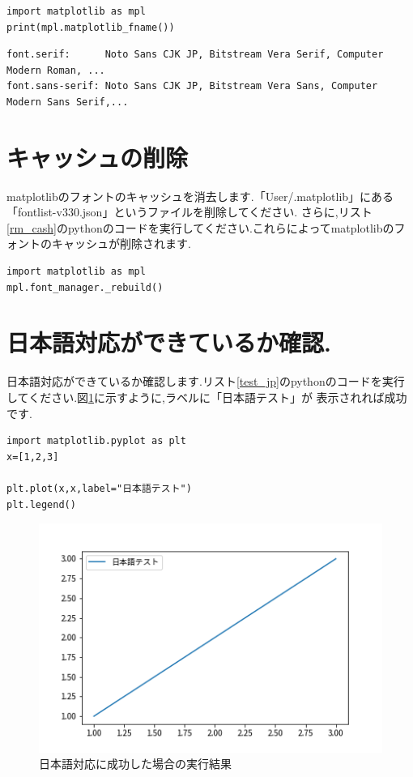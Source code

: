 \documentclass[a4j]{jarticle}
\begin{document}
      \begin{lstlisting}[basicstyle=\ttfamily\footnotesize, frame=single,label=where_rc,caption=matplotlibrcのpathを取得するコード]
import matplotlib as mpl
print(mpl.matplotlib_fname())
              \end{lstlisting}

      \begin{lstlisting}[basicstyle=\ttfamily\footnotesize, frame=single,label=rc_edit,caption=matplotlibrcの編集]
font.serif:      Noto Sans CJK JP, Bitstream Vera Serif, Computer Modern Roman, ...
font.sans-serif: Noto Sans CJK JP, Bitstream Vera Sans, Computer Modern Sans Serif,...
              \end{lstlisting}

\section{キャッシュの削除}
matplotlibのフォントのキャッシュを消去します.「User/.matplotlib」にある「fontlist-v330.json」というファイルを削除してください.
さらに,リスト\ref{rm_cash}のpythonのコードを実行してください.これらによってmatplotlibのフォントのキャッシュが削除されます.

\begin{lstlisting}[basicstyle=\ttfamily\footnotesize, frame=single,label=rm_cash,caption=キャッシュを削除するコード]
import matplotlib as mpl
mpl.font_manager._rebuild()
\end{lstlisting}

\section{日本語対応ができているか確認.}
日本語対応ができているか確認します.リスト\ref{test_jp}のpythonのコードを実行してください.図\ref{result}に示すように,ラベルに「日本語テスト」が
表示されれば成功です.
\begin{lstlisting}[basicstyle=\ttfamily\footnotesize, frame=single,label=test_jp,caption=日本語対応の確認のためのコード]
import matplotlib.pyplot as plt
x=[1,2,3]

plt.plot(x,x,label="日本語テスト")
plt.legend()
\end{lstlisting}

          \begin{figure}[H]
            \centering
            \includegraphics[scale=0.7]{result.png}
            \caption{日本語対応に成功した場合の実行結果}
             \label{result}
            \end{figure}
\end{document}
